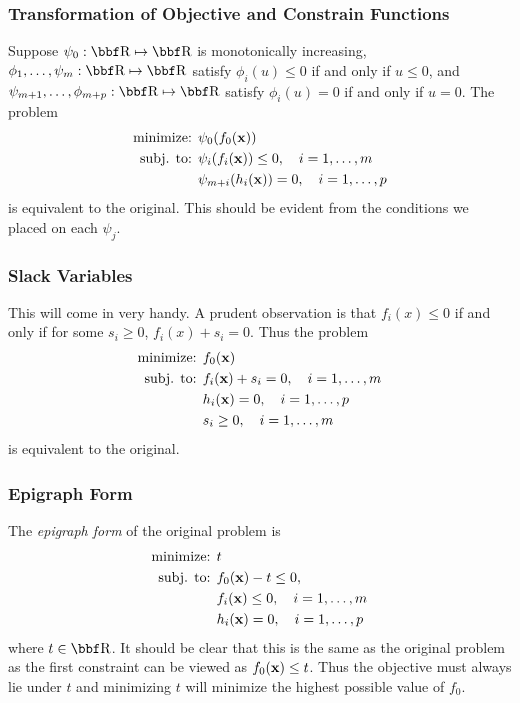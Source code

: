\documentclass{article}
\begin{document}
\subsubsection{Transformation of Objective and Constrain Functions}

Suppose $\psi_0 : \RR \mapsto \RR$ is monotonically increasing, $\phi_1,\dots,
\psi_m : \RR \mapsto \RR$ satisfy $\phi_i(u) \leq 0$ if and only if $u \leq 0$,
and $\psi_{m+1},\dots,\phi_{m+p} : \RR\mapsto\RR$ satisfy $\phi_i(u)=0$ if and only
if $u=0$. The problem
\begin{align*}
    \text{minimize: } & \psi_0(f_0({\bf x}))\\
    \text{subj. to: } & \psi_i(f_i({\bf x})) \leq 0, \quad i=1,\dots,m\\
                      & \psi_{m+i}(h_i({\bf x})) = 0, \quad i=1,\dots,p
\end{align*}
is equivalent to the original. This should be evident from the conditions
we placed on each $\psi_j$.

\subsubsection{Slack Variables}

This will come in very handy. A prudent observation is that $f_i(x)\leq 0$
if and only if for some $s_i \geq 0$, $f_i(x) + s_i = 0$. Thus the problem
\begin{align*}
    \text{minimize: } & f_0({\bf x})\\
    \text{subj. to: } & f_i({\bf x}) + s_i = 0, \quad i=1,\dots,m\\
                      & h_i({\bf x}) = 0, \quad i=1,\dots,p\\
                      & s_i \geq 0, \quad i=1,\dots,m
\end{align*}
is equivalent to the original.

\subsubsection{Epigraph Form}

The \textit{epigraph form} of the original problem is
\begin{align*}
    \text{minimize: } & t\\
    \text{subj. to: } & f_0({\bf x}) - t \leq 0,\\
                      & f_i({\bf x}) \leq 0, \quad i=1,\dots,m\\
                      & h_i({\bf x}) = 0, \quad i=1,\dots,p
\end{align*}
where $t\in\RR$. It should be clear that this is the same as the original
problem as the first constraint can be viewed as $f_0({\bf x}) \leq t$. Thus
the objective must always lie under $t$ and minimizing $t$ will minimize the
highest possible value of $f_0$.
\end{document}
